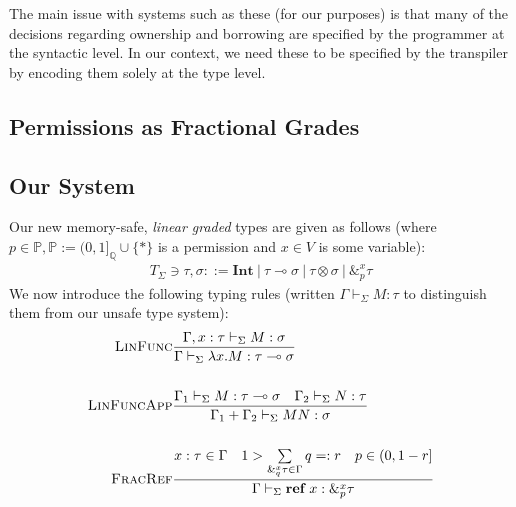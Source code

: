 \documentclass{article}
\renewcommand\em{\bfseries}
\newcommand{\mkref}{\textbf{ref}~}
\newcommand{\lolly}{\multimap}
\newcommand{\judge}[3]{\textsc{#1}&\frac{#2}{#3}}
\begin{document}

The main issue with systems such as these (for our purposes) is that many of the decisions regarding ownership and borrowing are specified by the programmer at the syntactic level. In our context, we need these to be specified by the transpiler by encoding them solely at the type level. 



\subsection{Permissions as Fractional Grades}

\subsection{Our System}

Our new memory-safe, \textit{linear graded} types are given as follows (where $p \in \mathbb{P}, \mathbb{P} := (0, 1]_{\mathbb{Q}} \cup \{*\}$ is a permission and $x \in V$ is some variable):
\begin{align*}
    T_\Sigma \ni \tau, \sigma ::=  \textbf{Int} ~|~ \tau \lolly \sigma ~|~ \tau \otimes \sigma ~|~ \&_p^x \tau 
\end{align*}
We now introduce the following typing rules (written $\Gamma \vdash_\Sigma M : \tau$ to distinguish them from our unsafe type system):
\begin{align*}
    \judge{LinFunc}{\Gamma, x : \tau \vdash_\Sigma M : \sigma}{ \Gamma \vdash_\Sigma \lambda x . M : \tau \lolly \sigma}\\
    ~\\
    \judge{LinFuncApp}{\Gamma_1 \vdash_\Sigma M : \tau \lolly \sigma \hspace{1em} \Gamma_2 \vdash_\Sigma N : \tau}{\Gamma_1 + \Gamma_2 \vdash_\Sigma M N : \sigma}\\
    ~\\
    \judge{FracRef}{x : \tau \in \Gamma \hspace{1em} 1 > \sum\limits_{\&_q^x \tau \in \Gamma} q =: r \hspace{1em} p \in (0, 1-r]}{\Gamma \vdash_\Sigma \mkref x : \&^x_p \tau}\\
\end{align*}






\renewcommand\em{\it}
\printbibliography[title={References}]
\end{document}
